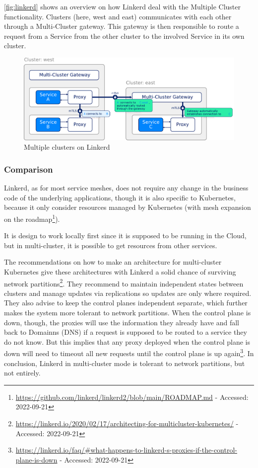 \autoref{fig:linkerd} shows an overview on how Linkerd deal with the
Multiple Cluster functionality.
%
Clusters (here, west and east) communicates with each other through a
Multi-Cluster gateway.
%
This gateway is then responsible to route a request from a Service
from the other cluster to the involved Service in its own cluster.
\begin{figure}[htbp]
  \centering  \includegraphics[width=0.75\linewidth]{figs/pdf/linkerd-multi-cluster}
  \caption{Multiple clusters on Linkerd}
  \label{fig:linkerd}
\end{figure}

\subsubsection*{Comparison}

Linkerd, as for most service meshes, does not require any change in
the business code of the underlying applications, though it is also
specific to Kubernetes, because it only consider resources managed by
Kubernetes (with mesh expansion on the
roadmap\footnote{\url{https://github.com/linkerd/linkerd2/blob/main/ROADMAP.md}
  - Accessed: 2022-09-21}).

It is design to work locally first since it is supposed to be running
in the Cloud, but in multi-cluster, it is possible to get resources
from other services.


The recommendations on how to make an architecture for multi-cluster
Kubernetes give these architectures with Linkerd a solid chance of
surviving network
partitions\footnote{\url{https://linkerd.io/2020/02/17/architecting-for-multicluster-kubernetes/}
  - Accessed: 2022-09-21}.
%
They recommend to maintain independent states between clusters and
manage updates via replications so updates are only where required.
%
They also advise to keep the control planes independent separate,
which further makes the system more tolerant to network partitions.
%
When the control plane is down, though, the proxies will use the
information they already have and fall back to \gls{Domainns} (\acrshort{DNS}) if a
request is supposed to be routed to a service they do not know.
%
But this implies that any proxy deployed when the control plane is
down will need to timeout all new requests until the control plane is
up
again\footnote{\url{https://linkerd.io/faq/\#what-happens-to-linkerd-s-proxies-if-the-control-plane-is-down}
  - Accessed: 2022-09-21}.
%
In conclusion, Linkerd in multi-cluster mode is tolerant to network
partitions, but not entirely.

